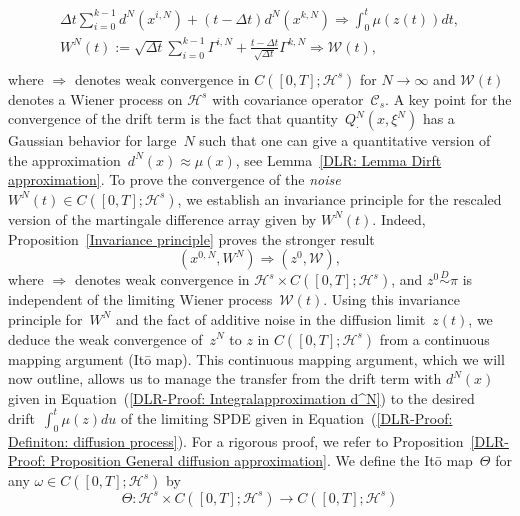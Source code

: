 \begin{equation}
  \label{DLR-Proof: Definition W^N}
  \begin{split}
   \Delta t \sum_{i=0}^{k-1} d^N(x^{i,N}) + (t - \Delta t) d^N(x^{k,N}) \Longrightarrow \int_0^t \mu(z(t)) dt, \\
   W^N(t) := \sqrt{ \Delta t} \sum_{i=0}^{k-1} \Gamma^{i,N} +  \frac{t - \Delta t}{\sqrt{\Delta t}} \Gamma^{k,N} \Longrightarrow \mathcal{W}(t), \\
 \end{split}
\end{equation}
where $\Longrightarrow$ denotes weak convergence in $C([0,T];\mathcal{H}^s)$ for $N \to \infty$ and $\mathcal{W}(t)$ denotes a Wiener process on $\mathcal{H}^s$ with  covariance operator~$\mathcal{C}_s$. A key point for the convergence of the drift term is the fact that quantity~$Q^N_{\cdot}(x, \xi^N)$ has a Gaussian behavior for large~$N$ such that one can give a quantitative version of the approximation~$ d^N(x) \approx \mu(x) $, see Lemma~\ref{DLR: Lemma Dirft approximation}. To prove the convergence of the \textit{noise}~$W^N(t) \in C([0,T];\mathcal{H}^s)$, we establish an invariance principle for the rescaled version of the martingale difference array given by $W^N(t)$. Indeed, Proposition~\ref{Invariance principle} proves the stronger result
\begin{equation*}
  (x^{0,N}, W^N) \Longrightarrow (z^0, \mathcal{W}),
\end{equation*}
where $\Longrightarrow$ denotes weak convergence in $\mathcal{H}^s \times C([0,T];\mathcal{H}^s)$, and $z^0 \stackrel{D}{\sim} \pi$ is independent of the limiting Wiener process~$\mathcal{W}(t)$. Using this invariance principle for~$W^N$ and the fact of additive noise in the diffusion limit~$z(t)$, we deduce the weak convergence of~$z^N$ to $z$ in $ C([0,T];\mathcal{H}^s)$ from a continuous  mapping argument (It\={o} map). This continuous mapping argument, which we will now outline, allows us to manage the transfer from the drift term with $d^N(x)$ given in Equation~(\ref{DLR-Proof: Integralapproximation d^N}) to the desired drift~$ \int_0^t \mu(z) du$ of the limiting SPDE given in Equation~(\ref{DLR-Proof: Definiton: diffusion process}). For a rigorous proof, we refer to Proposition~\ref{DLR-Proof: Proposition General diffusion approximation}. We define the It\={o} map~$\Theta$ for any $\omega \in C([0,T];\mathcal{H}^s)$ by 
\begin{equation*}
 \Theta : \mathcal{H}^s \times C([0,T];\mathcal{H}^s) \to C([0,T];\mathcal{H}^s)
\end{equation*}
